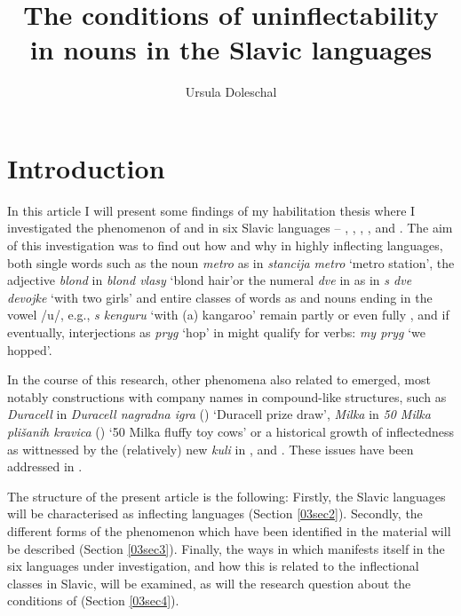 \documentclass[output=paper,colorlinks,citecolor=brown]{langscibook}
\author{Ursula Doleschal\orcid{}\affiliation{University of Klagenfurt, Department of Slavic Studies and Writing Center}}
\title{The conditions of uninflectability in nouns in the Slavic languages}
\begin{document}
\maketitle

\section{Introduction} 
In this article I will present some findings of my habilitation thesis \citep{doleschal2000} where I investigated the phenomenon of  and  in six Slavic languages -- , , , ,  and . The aim of this investigation was to find out how and why in highly inflecting languages, both single words such as the  noun \emph{metro} as in \emph{stancija} \emph{metro} `metro station', the  adjective \emph{blond} in \emph{blond vlasy} `blond hair'or the numeral \emph{dve} in  as in \emph{s dve devojke} `with two girls' and entire classes of words as  and  nouns ending in the vowel /u/, e.g., \emph{s kenguru} `with (a) kangaroo' remain partly or even fully , and if eventually, interjections as \emph{pryg} `hop' in  might qualify for  verbs: \emph{my pryg} `we hopped'.

In the course of this research, other phenomena also related to  emerged, most notably constructions with company names in compound-like structures, such as \emph{Duracell} in \emph{Duracell nagradna igra} () `Duracell prize draw', \emph{Milka} in \emph{50 Milka plišanih kravica} () `50 Milka fluffy toy cows' or a historical growth of inflectedness as wittnessed by the (relatively) new  \emph{kuli} in ,  and . These issues have been addressed in \citet{doleschal1999, doleschal2008, doleschal2015, doleschal2017}.

The structure of the present article is the following: Firstly, the Slavic languages will be characterised as inflecting languages (Section \ref{03sec2}). Secondly, the different forms of the phenomenon which have been identified in the material will be described (Section \ref{03sec3}). Finally, the ways in which  manifests itself in the six languages under investigation, and how this  is related to the inflectional classes in Slavic, will be examined, as will the research question about the conditions of  (Section \ref{03sec4}).
\end{document}
